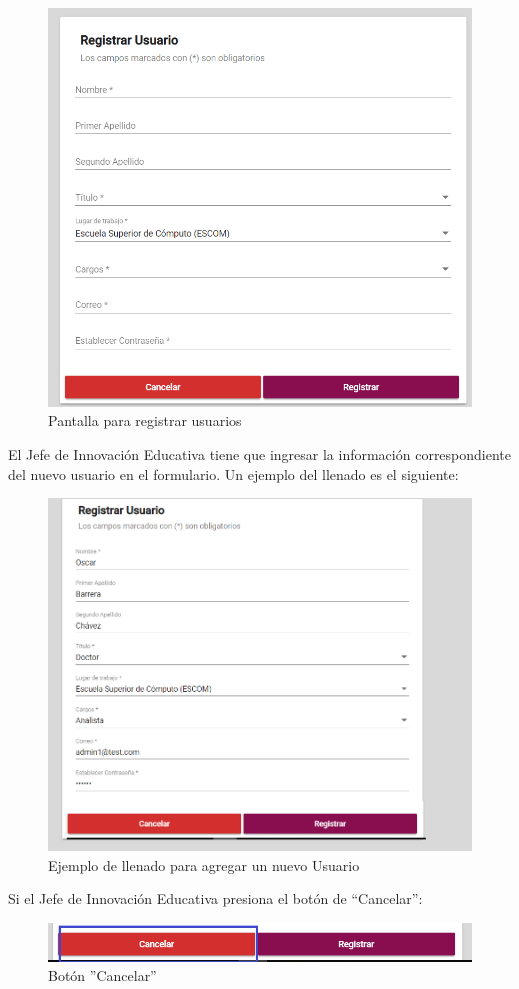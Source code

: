 \begin{figure}[H]
	\centering
	\hypertarget{registrar-Us-JIE}{\includegraphics[width=0.7\linewidth]{images/SP5/Registro-Usuario-vacio}}
	\caption{Pantalla para registrar usuarios}
	\label{registrarrh-JIE}
\end{figure}

El Jefe de Innovación Educativa tiene que ingresar la información correspondiente del nuevo usuario en el formulario. Un ejemplo del llenado  es el siguiente:

\begin{figure}[H]
	\centering
	\hypertarget{ejreg-JIE}{\includegraphics[width=0.7\linewidth]{images/SP5/Registro-Usuario-UA}}
	\caption{Ejemplo de llenado para agregar un nuevo Usuario}
	\label{ejreg-JIE}
\end{figure}

\newpage
Si el Jefe de Innovación Educativa presiona el botón de “Cancelar”:

\begin{figure}[H]
	\centering
	\hypertarget{cancel1-JIE}{\includegraphics[width=0.7\linewidth]{images/SP5/BtnCancelar1}}
	\caption{Botón ''Cancelar''}
	\label{cancel1-JIE}
\end{figure}

